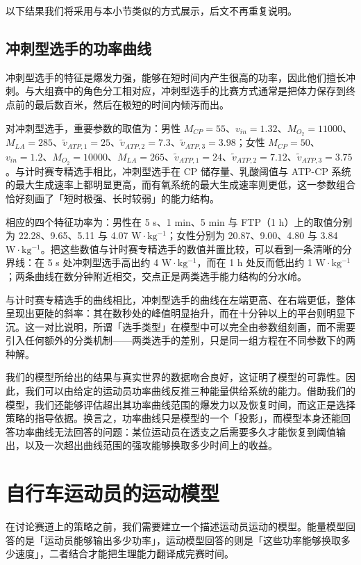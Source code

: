 \documentclass[11pt,a4paper]{ctexart}
\begin{document}
以下结果我们将采用与本小节类似的方式展示，后文不再重复说明。

\subsection{冲刺型选手的功率曲线}

冲刺型选手的特征是爆发力强，能够在短时间内产生很高的功率，因此他们擅长冲刺。与大组赛中的角色分工相对应，冲刺型选手的比赛方式通常是把体力保存到终点前的最后数百米，然后在极短的时间内倾泻而出。

对冲刺型选手，重要参数的取值为：男性 $M_{CP}=55$、$v_{in}=1.32$、$M_{O_2}=11000$、$M_{LA}=285$、$\tilde{v}_{ATP,1}=25$、$\tilde{v}_{ATP,2}=7.3$、$\tilde{v}_{ATP,3}=3.98$；女性 $M_{CP}=50$、$v_{in}=1.2$、$M_{O_2}=10000$、$M_{LA}=265$、$\tilde{v}_{ATP,1}=24$、$\tilde{v}_{ATP,2}=7.12$、$\tilde{v}_{ATP,3}=3.75$。与计时赛专精选手相比，冲刺型选手在 CP 储存量、乳酸阈值与 ATP-CP 系统的最大生成速率上都明显更高，而有氧系统的最大生成速率则更低，这一参数组合恰好刻画了「短时极强、长时较弱」的能力结构。

相应的四个特征功率为：男性在 5 s、1 min、5 min 与 FTP（1 h）上的取值分别为 22.28、9.65、5.11 与 4.07 $\mathrm{W\cdot kg^{-1}}$；女性分别为 20.87、9.00、4.80 与 3.84 $\mathrm{W\cdot kg^{-1}}$。把这些数值与计时赛专精选手的数值并置比较，可以看到一条清晰的分界线：在 5 s 处冲刺型选手高出约 4 $\mathrm{W\cdot kg^{-1}}$，而在 1 h 处反而低出约 1 $\mathrm{W\cdot kg^{-1}}$；两条曲线在数分钟附近相交，交点正是两类选手能力结构的分水岭。

与计时赛专精选手的曲线相比，冲刺型选手的曲线在左端更高、在右端更低，整体呈现出更陡的斜率：其在数秒处的峰值明显抬升，而在十分钟以上的平台则明显下沉。这一对比说明，所谓「选手类型」在模型中可以完全由参数组刻画，而不需要引入任何额外的分类机制——两类选手的差别，只是同一组方程在不同参数下的两种解。

我们的模型所给出的结果与真实世界的数据吻合良好，这证明了模型的可靠性。因此，我们可以由给定的运动员功率曲线反推三种能量供给系统的能力。借助我们的模型，我们还能够评估超出其功率曲线范围的爆发力以及恢复时间，而这正是选择策略的指导依据。换言之，功率曲线只是模型的一个「投影」，而模型本身还能回答功率曲线无法回答的问题：某位运动员在透支之后需要多久才能恢复到阈值输出，以及一次超出曲线范围的强攻能够换取多少时间上的收益。

\section{自行车运动员的运动模型}

在讨论赛道上的策略之前，我们需要建立一个描述运动员运动的模型。能量模型回答的是「运动员能够输出多少功率」，运动模型回答的则是「这些功率能够换取多少速度」，二者结合才能把生理能力翻译成完赛时间。
\end{document}
